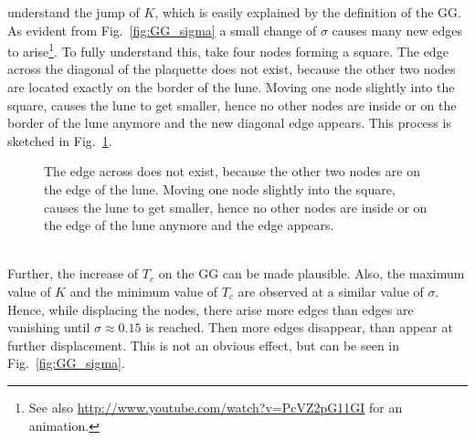         understand the jump of \(K\), which is easily explained
        by the definition of the GG. As evident from Fig.\ \ref{fig:GG_sigma}
        a small change of \(\sigma\) causes many new edges to arise\footnote{See also \url{http://www.youtube.com/watch?v=PcVZ2pG11GI} for an animation.}.
        To fully understand this, take four nodes forming a square. The edge
        across the diagonal of the plaquette does not exist, because the
        other two nodes are located exactly on the border
        of the lune. Moving one node slightly into the square, causes the lune
        to get smaller, hence no other nodes are inside or on the border of
        the lune anymore and the new diagonal edge appears. This process is sketched in
        Fig.\ \ref{fig:GGEdge}.
        \begin{figure}[htbp]
            \centering
            \subfigure[][]{
                \label{sfig:GGEdge:before}
                
            }
            \subfigure[][]{
                \label{sfig:GGEdge:after}
                
            }
            \caption[Sketch why Many New Edges Arise at the Transition from $\sigma = 0$ to $\sigma > 0$]
            {
                 The edge across does not exist,
                because the other two nodes are on the edge of the lune.
                 Moving one node slightly into the
                square, causes the lune to get smaller, hence no other nodes
                are inside or on the edge of the lune anymore and the edge
                appears.
            }
            \label{fig:GGEdge}
        \end{figure}\\
        Further, the increase of \(T_c\) on the GG can be made plausible.
        Also, the maximum value of \(K\) and the minimum value of \(T_c\)
        are observed at a similar value of \(\sigma\). Hence, while displacing the nodes, there arise more edges
        than edges are vanishing until \(\sigma \approx 0.15\) is reached.
        Then more edges disappear, than appear at further displacement. This
        is not an obvious effect, but can be seen in Fig.\ \ref{fig:GG_sigma}.
